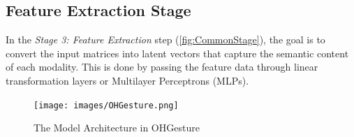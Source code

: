\subsection{Feature Extraction Stage}
\label{subsec:feature_extraction}

In the \textit{Stage 3: Feature Extraction} step (\autoref{fig:CommonStage}), the goal is to convert the input matrices into latent vectors that capture the semantic content of each modality. This is done by passing the feature data through linear transformation layers or Multilayer Perceptrons (MLPs).



\begin{figure}[H]
	\centering
	\texttt{[image: images/OHGesture.png]}
	\caption{The Model Architecture in OHGesture}
	\label{fig:OHGesture}
\end{figure}


